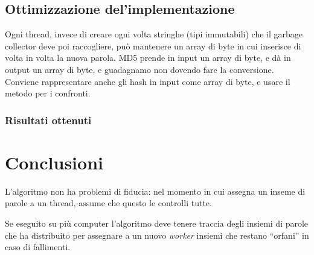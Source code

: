 \documentclass[]{myarticle}
\begin{document}

\subsection{Ottimizzazione del'implementazione}

Ogni thread, invece di creare ogni volta stringhe (tipi immutabili) che il garbage collector deve poi raccogliere, pu\`o mantenere un array di byte in cui inserisce di volta in volta la nuova parola.
MD5 prende in input un array di byte, e d\`a in output un array di byte, e guadagnamo non dovendo fare la conversione.
Conviene rappresentare anche gli hash in input come array di byte, e usare il metodo  per i confronti.


\subsubsection{Risultati ottenuti}


\section{Conclusioni}

L'algoritmo non ha problemi di fiducia: nel momento in cui assegna un inseme di parole a un thread, assume che questo le controlli tutte.

Se eseguito su pi\`u computer l'algoritmo deve tenere traccia degli insiemi di parole che ha distribuito per assegnare a un nuovo \emph{worker} insiemi che restano ``orfani'' in caso di fallimenti.

\renewcommand{\refname}{Riferimenti}
\printbibliography
\end{document}
